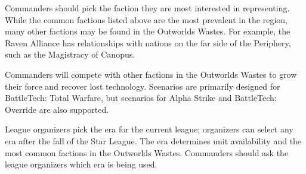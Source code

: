 Commanders should pick the faction they are most interested in representing.
While the common factions listed above are the most prevalent in the region, many other factions may be found in the Outworlds Wastes.
For example, the Raven Alliance has relationships with nations on the far side of the Periphery, such as the Magistracy of Canopus.

Commanders will compete with other factions in the Outworlds Wastes to grow their force and recover lost technology.
Scenarios are primarily designed for BattleTech: Total Warfare, but scenarios for Alpha Strike and BattleTech: Override are also supported.

League organizers pick the era for the current league; organizers can select any era after the fall of the Star League.
The era determines unit availability and the most common factions in the Outworlds Wastes.
Commanders should ask the league organizers which era is being used.
